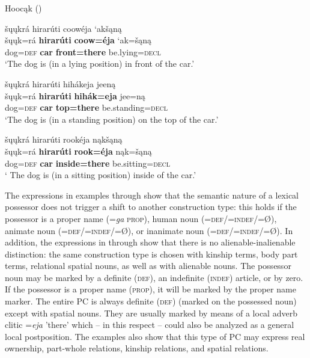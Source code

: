 \documentclass[output=paper]{LSP/langsci}
\begin{document}
\ea Hooc\k{a}k (\citealt[14]{Helmbrecht2003}) \label{dogposition}

\ea 
\glll \v{s}\k{u}\k{u}kr\'a hirar\'uti  coow\'eja `ak\v{s}\k{a}n\k{a}  \\
\v{s}\k{u}\k{u}k=r\'a \textbf{hirar\'uti}  \textbf{coow=\'eja} `ak=\v{s}\k{a}n\k{a} \\ 
dog=\textsc{def} \textbf{car} \textbf{front=there} be.lying=\textsc{decl} \\
\glt `The dog is (in a lying position) in front of the car.'

\ex 
\glll šųųkrá hirarúti hihákeja jeen\k{a}\\
\v{s}\k{u}\k{u}k=r\'a \textbf{hirar\'uti} \textbf{hih\'ak=eja} jee=n\k{a} \\
dog=\textsc{def}  \textbf{car} \textbf{top=there} be.standing=\textsc{decl} \\
\glt `The dog is (in a standing position) on the top of the car.'

\ex 
\glll šųųkrá hirarúti rookéja n\k{a}k\v{s}\k{a}n\k{a}\\
\v{s}\k{u}\k{u}k=r\'a   \textbf{hirar\'uti} \textbf{rook=\'eja} n\k{a}k=\v{s}\k{a}n\k{a} \\
dog=\textsc{def} \textbf{car} \textbf{inside=there} be.sitting=\textsc{decl} \\
\glt` The dog is (in a sitting position) inside of the car.'
\z
\z

The expressions in examples  through  show that the semantic nature of a lexical possessor does not trigger a shift to another construction type: this holds if the possessor is a proper name (=\textit{ga} \textsc{prop}), human noun (=\textsc{def/=indef/}=Ø), animate noun (=\textsc{def/=indef}/=Ø), or inanimate noun (=\textsc{def/=indef}/=Ø). In addition, the expressions in  through  show that there is no alienable-inalienable distinction: the same construction type is chosen with kinship terms, body part terms, relational spatial nouns, as well as with alienable nouns. The possessor noun may be marked by a definite (\textsc{def}), an indefinite (\textsc{indef}) article, or by zero. If the possessor is a proper name (\textsc{prop}), it will be marked by the proper name marker. The entire PC is always definite (\textsc{def}) (marked on the possessed noun) except with spatial nouns. They are usually marked by means of a local adverb clitic =\textit{eja} 'there' which – in this respect – could also be analyzed as a general local postposition. The examples also show that this type of PC may express real ownership, part-whole relations, kinship relations, and spatial relations.
\end{document}
